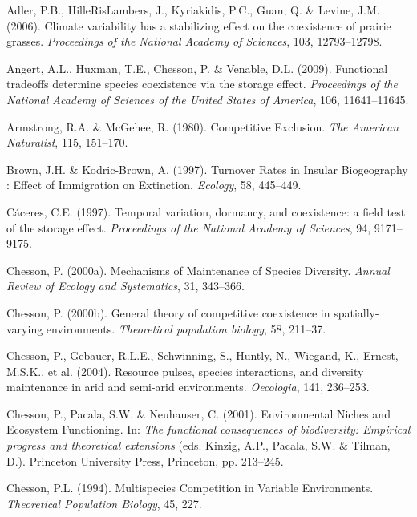 \documentclass[12pt,]{article}
\begin{document}
\hypertarget{refs}{}
\hypertarget{ref-Adler2006}{}
Adler, P.B., HilleRisLambers, J., Kyriakidis, P.C., Guan, Q. \& Levine,
J.M. (2006). Climate variability has a stabilizing effect on the
coexistence of prairie grasses. \emph{Proceedings of the National
Academy of Sciences}, 103, 12793--12798.

\hypertarget{ref-Angert2009}{}
Angert, A.L., Huxman, T.E., Chesson, P. \& Venable, D.L. (2009).
Functional tradeoffs determine species coexistence via the storage
effect. \emph{Proceedings of the National Academy of Sciences of the
United States of America}, 106, 11641--11645.

\hypertarget{ref-Armstrong1980}{}
Armstrong, R.A. \& McGehee, R. (1980). Competitive Exclusion. \emph{The
American Naturalist}, 115, 151--170.

\hypertarget{ref-Brown1997}{}
Brown, J.H. \& Kodric-Brown, A. (1997). Turnover Rates in Insular
Biogeography : Effect of Immigration on Extinction. \emph{Ecology}, 58,
445--449.

\hypertarget{ref-Caceres1997}{}
Cáceres, C.E. (1997). Temporal variation, dormancy, and coexistence: a
field test of the storage effect. \emph{Proceedings of the National
Academy of Sciences}, 94, 9171--9175.

\hypertarget{ref-Chesson2000}{}
Chesson, P. (2000a). Mechanisms of Maintenance of Species Diversity.
\emph{Annual Review of Ecology and Systematics}, 31, 343--366.

\hypertarget{ref-Chesson2000a}{}
Chesson, P. (2000b). General theory of competitive coexistence in
spatially-varying environments. \emph{Theoretical population biology},
58, 211--37.

\hypertarget{ref-Chesson2004}{}
Chesson, P., Gebauer, R.L.E., Schwinning, S., Huntly, N., Wiegand, K.,
Ernest, M.S.K., et al. (2004). Resource pulses, species interactions,
and diversity maintenance in arid and semi-arid environments.
\emph{Oecologia}, 141, 236--253.

\hypertarget{ref-Chesson2001}{}
Chesson, P., Pacala, S.W. \& Neuhauser, C. (2001). Environmental Niches
and Ecosystem Functioning. In: \emph{The functional consequences of
biodiversity: Empirical progress and theoretical extensions} (eds.
Kinzig, A.P., Pacala, S.W. \& Tilman, D.). Princeton University Press,
Princeton, pp. 213--245.

\hypertarget{ref-Chesson1994}{}
Chesson, P.L. (1994). Multispecies Competition in Variable Environments.
\emph{Theoretical Population Biology}, 45, 227.
\end{document}

